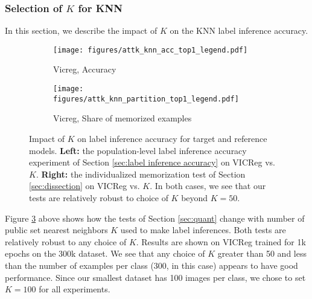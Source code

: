 
\subsubsection{Selection of $K$ for KNN}
\label{sec:appx KNN} 
In this section, we describe the impact of $K$ on the KNN label inference accuracy. 

\begin{figure}[ht]
     \centering
     \begin{subfigure}[b]{0.49\textwidth}
         \centering
         \texttt{[image: figures/attk\_knn\_acc\_top1\_legend.pdf]}
         \caption{Vicreg, Accuracy}
         \label{fig:vicreg v. epoch}
     \end{subfigure}
     \hfill
     \begin{subfigure}[b]{0.49\textwidth}
         \centering
         \texttt{[image: figures/attk\_knn\_partition\_top1\_legend.pdf]}
         \caption{Vicreg, Share of memorized examples }
         \label{fig:vicreg lp v. epoch}
     \end{subfigure}
     \hfill
\caption{
Impact of $K$ on label inference accuracy for target and reference models. \textbf{Left:} the population-level label inference accuracy experiment of Section \ref{sec:label inference accuracy} on VICReg vs. $K$. \textbf{Right:} the individualized memorization test of Section \ref{sec:dissection} on VICReg vs. $K$. In both cases, we see that our tests are relatively robust to choice of $K$ beyond $K=50$.  
}
\label{fig:attack v K}
\end{figure}

Figure \ref{fig:attack v K} above shows how the tests of Section \ref{sec:quant} change with number of public set nearest neighbors $K$ used to make label inferences. Both tests are relatively robust to any choice of $K$. Results are shown on VICReg trained for 1k epochs on the 300k dataset. We see that any choice of $K$ greater than 50 and less than the number of examples per class (300, in this case) appears to have good performance. Since our smallest dataset has 100 images per class, we chose to set $K = 100$ for all experiments. 

\clearpage

